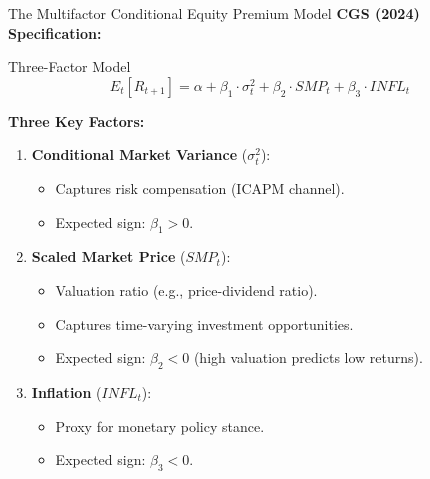 \documentclass{beamer}
\begin{document}
\begin{frame}{The Multifactor Conditional Equity Premium Model}
    \textbf{CGS (2024) Specification:}
    
    \begin{block}{Three-Factor Model}
        \begin{equation}
            E_t[R_{t+1}] = \alpha + \beta_1 \cdot \sigma_t^2 + \beta_2 \cdot SMP_t + \beta_3 \cdot INFL_t
        \end{equation}
    \end{block}
    
    \textbf{Three Key Factors:}
    \begin{enumerate}
        \item \textbf{Conditional Market Variance} ($\sigma_t^2$):
            \begin{itemize}
                \item Captures risk compensation (ICAPM channel).
                \item Expected sign: $\beta_1 > 0$.
            \end{itemize}
        
        \item \textbf{Scaled Market Price} ($SMP_t$):
            \begin{itemize}
                \item Valuation ratio (e.g., price-dividend ratio).
                \item Captures time-varying investment opportunities.
                \item Expected sign: $\beta_2 < 0$ (high valuation predicts low returns).
            \end{itemize}
        
        \item \textbf{Inflation} ($INFL_t$):
            \begin{itemize}
                \item Proxy for monetary policy stance.
                \item Expected sign: $\beta_3 < 0$.
            \end{itemize}
    \end{enumerate}
\end{frame}
\end{document}

